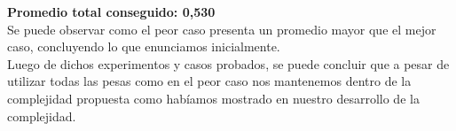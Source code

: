 \textbf{Promedio total conseguido: 0,530}\\

Se puede observar como el peor caso presenta un promedio mayor que el mejor caso, concluyendo lo que enunciamos inicialmente.\\

Luego de dichos experimentos y casos probados, se puede concluir que a pesar de utilizar todas las pesas como en el peor caso nos mantenemos dentro de la complejidad propuesta como hab\'iamos mostrado en nuestro desarrollo de la complejidad.\\
